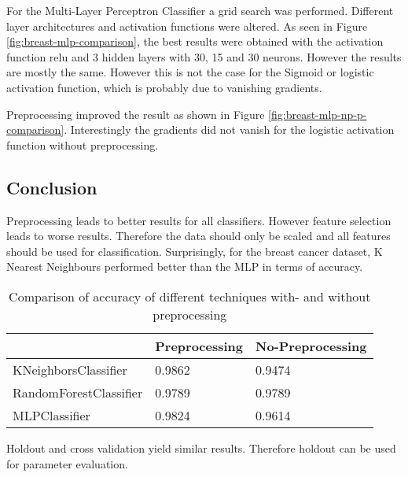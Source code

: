 For the Multi-Layer Perceptron Classifier a grid search was performed.
Different layer architectures and activation functions were altered.
As seen in Figure \ref{fig:breast-mlp-comparison}, the best results were obtained with the activation function relu and 3 hidden layers with 30, 15 and 30 neurons.
However the results are mostly the same. However  this is not the case for the Sigmoid or logistic activation function, which is probably due to vanishing gradients.


Preprocessing improved the result as shown in Figure \ref{fig:breast-mlp-np-p-comparison}.
Interestingly the gradients did not vanish for the logistic activation function without preprocessing.


\subsection{Conclusion}

Preprocessing leads to better results for all classifiers.
However feature selection leads to worse results.
Therefore the data should only be scaled and all features should be used for classification. Surprisingly, for the breast cancer dataset, K Nearest Neighbours performed better than the MLP in terms of accuracy.

\begin{table}[H]
\begin{center}
\begin{tabular}{|l|l|l|}
\hline
                       & Preprocessing & No-Preprocessing \\ \hline
KNeighborsClassifier   & 0.9862        & 0.9474           \\ \hline
RandomForestClassifier & 0.9789        & 0.9789           \\ \hline
MLPClassifier          & 0.9824        & 0.9614           \\ \hline
\end{tabular}
\caption{Comparison of accuracy of different techniques with- and without preprocessing}
\end{center}
\end{table}

Holdout and cross validation yield similar results.
Therefore holdout can be used for parameter evaluation.

